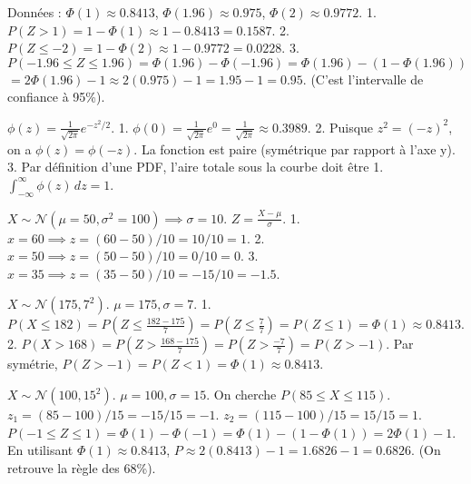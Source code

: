 \begin{correctionbox}
Données : $\Phi(1) \approx 0.8413$, $\Phi(1.96) \approx 0.975$, $\Phi(2) \approx 0.9772$.
1.  $P(Z > 1) = 1 - \Phi(1) \approx 1 - 0.8413 = 0.1587$.
2.  $P(Z \le -2) = 1 - \Phi(2) \approx 1 - 0.9772 = 0.0228$.
3.  $P(-1.96 \le Z \le 1.96) = \Phi(1.96) - \Phi(-1.96) = \Phi(1.96) - (1 - \Phi(1.96))$
    $= 2\Phi(1.96) - 1 \approx 2(0.975) - 1 = 1.95 - 1 = 0.95$.
    (C'est l'intervalle de confiance à 95\%).
\end{correctionbox}

\begin{correctionbox}
$\phi(z) = \frac{1}{\sqrt{2\pi}} e^{-z^2/2}$.
1.  $\phi(0) = \frac{1}{\sqrt{2\pi}} e^{0} = \frac{1}{\sqrt{2\pi}} \approx 0.3989$.
2.  Puisque $z^2 = (-z)^2$, on a $\phi(z) = \phi(-z)$. La fonction est paire (symétrique par rapport à l'axe y).
3.  Par définition d'une PDF, l'aire totale sous la courbe doit être 1. $\int_{-\infty}^{\infty} \phi(z) \, dz = 1$.
\end{correctionbox}


\begin{correctionbox}
$X \sim \mathcal{N}(\mu=50, \sigma^2=100) \implies \sigma=10$.
$Z = \frac{X - \mu}{\sigma}$.
1.  $x = 60 \implies z = (60 - 50) / 10 = 10 / 10 = 1$.
2.  $x = 50 \implies z = (50 - 50) / 10 = 0 / 10 = 0$.
3.  $x = 35 \implies z = (35 - 50) / 10 = -15 / 10 = -1.5$.
\end{correctionbox}

\begin{correctionbox}
$X \sim \mathcal{N}(175, 7^2)$. $\mu=175, \sigma=7$.
1.  $P(X \le 182) = P\left(Z \le \frac{182 - 175}{7}\right) = P(Z \le \frac{7}{7}) = P(Z \le 1) = \Phi(1) \approx 0.8413$.
2.  $P(X > 168) = P\left(Z > \frac{168 - 175}{7}\right) = P(Z > \frac{-7}{7}) = P(Z > -1)$.
    Par symétrie, $P(Z > -1) = P(Z < 1) = \Phi(1) \approx 0.8413$.
\end{correctionbox}

\begin{correctionbox}
$X \sim \mathcal{N}(100, 15^2)$. $\mu=100, \sigma=15$.
On cherche $P(85 \le X \le 115)$.
$z_1 = (85 - 100) / 15 = -15 / 15 = -1$.
$z_2 = (115 - 100) / 15 = 15 / 15 = 1$.
$P(-1 \le Z \le 1) = \Phi(1) - \Phi(-1) = \Phi(1) - (1 - \Phi(1)) = 2\Phi(1) - 1$.
En utilisant $\Phi(1) \approx 0.8413$, $P \approx 2(0.8413) - 1 = 1.6826 - 1 = 0.6826$.
(On retrouve la règle des 68\%).
\end{correctionbox}

